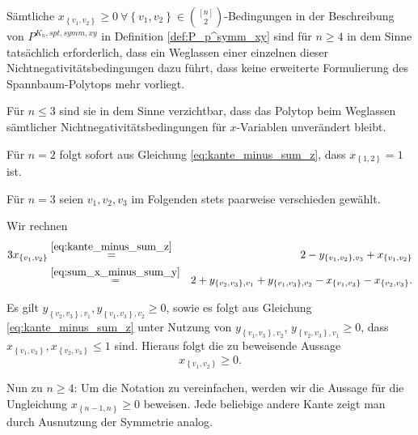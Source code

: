 \documentclass[10p,a4paper,BCOR = 12mm, DIV=15]{scrbook}
\begin{document}
\begin{Sa}
Sämtliche $x_{\left\{v_1, v_2\right\}}\geq 0 \ \forall \left\{v_1, v_2\right\} \in {\left[n\right] \choose 2}$-Bedingungen in der Beschreibung von $P^{K_n, spt, symm, xy}$ in Definition \ref{def:P_p^symm_xy} sind für $n\geq 4$ in dem Sinne tatsächlich erforderlich, dass ein Weglassen einer einzelnen dieser Nichtnegativitätsbedingungen dazu führt, dass keine erweiterte Formulierung des Spannbaum-Polytops mehr vorliegt.

Für $n\leq 3$ sind sie in dem Sinne verzichtbar, dass das Polytop beim Weglassen sämtlicher Nichtnegativitätsbedingungen für $x$-Variablen unverändert bleibt.
\end{Sa}
\begin{bew}
Für $n = 2$ folgt sofort aus Gleichung \eqref{eq:kante_minus_sum_z}, dass $x_{\left\{1, 2\right\}} = 1$ ist.

Für $n = 3$ seien $v_1, v_2, v_3$ im Folgenden stets paarweise verschieden gewählt.

Wir rechnen
\begin{eqnarray*}
3 x_{\left\{v_1, v_2\right\}} 
& \stackrel{\eqref{eq:kante_minus_sum_z}}{=} & 2-y_{\left\{v_1, v_2\right\}, v_3}+x_{\left\{v_1, v_2\right\}}  \\
& \stackrel{\eqref{eq:sum_x_minus_sum_y}}{=} & 2+y_{\left\{v_2, v_3\right\}, v_1}+y_{\left\{v_1, v_3\right\}, v_2}-x_{\left\{v_1, v_3\right\}}-x_{\left\{v_2, v_3\right\}}.
\end{eqnarray*}

Es gilt $y_{\left\{v_2, v_3\right\}, v_1}, y_{\left\{v_1, v_3\right\}, v_2} \geq 0$, sowie es folgt aus Gleichung \eqref{eq:kante_minus_sum_z} unter Nutzung von $y_{\left\{v_1, v_3\right\}, v_2}$, $y_{\left\{v_2, v_3\right\}, v_1} \geq 0$, dass $x_{\left\{v_1, v_3\right\}}, x_{\left\{v_2, v_3\right\}} \leq 1$ sind. Hieraus folgt die zu beweisende Aussage
\begin{displaymath}
x_{\left\{v_1, v_2\right\}} \geq 0.
\end{displaymath}

Nun zu $n\geq 4$: Um die Notation zu vereinfachen, werden wir die Aussage für die Ungleichung $x_{\left\{n-1, n\right\}} \geq 0$ beweisen. Jede beliebige andere Kante zeigt man durch Ausnutzung der Symmetrie analog.


\end{bew}
\end{document}
